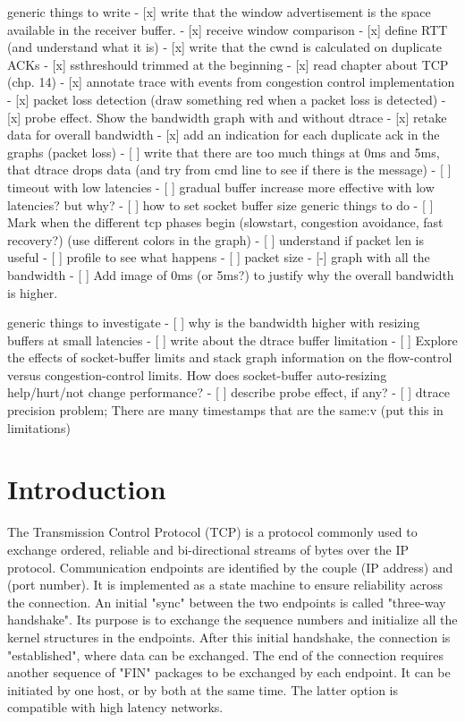 \documentclass[a4paper,10pt]{article}
\begin{document}
generic things to write
- [x] write that the window advertisement is the space available in the receiver buffer.
- [x] receive window comparison
- [x] define RTT (and understand what it is)
- [x] write that the cwnd is calculated on duplicate ACKs
- [x] ssthreshould trimmed at the beginning
- [x] read chapter about TCP (chp. 14)
- [x] annotate trace with events from congestion control implementation
- [x] packet loss detection (draw something red when a packet loss is detected)
- [x] probe effect. Show the bandwidth graph with and without dtrace
- [x] retake data for overall bandwidth
- [x] add an indication for each duplicate ack in the graphs (packet loss)
- [ ] write that there are too much things at 0ms and 5ms, that dtrace drops data (and try from cmd line to see if there is the message)
- [ ] timeout with low latencies
- [ ] gradual buffer increase more effective with low latencies? but why?
- [ ] how to set socket buffer size
generic things to do 
- [ ] Mark when  the different tcp phases begin (slowstart, congestion avoidance, fast recovery?) (use different colors in the graph)
- [ ] understand if packet len is useful
- [ ] profile to see what happens
- [ ] packet size
- [-] graph with all the bandwidth
- [ ] Add image of 0ms (or 5ms?) to justify why the overall bandwidth is higher.

generic things to investigate
- [ ] why is the bandwidth higher with resizing buffers at small latencies
- [ ] write about the dtrace buffer limitation
- [ ] Explore the effects of socket-buffer limits and stack graph information on the flow-control versus congestion-control limits. How does socket-buffer auto-resizing help/hurt/not change performance? 
- [ ] describe probe effect, if any?
- [ ] dtrace precision problem; There are many timestamps that are the same:v (put this in limitations)
\fi

\clearpage

\setcounter{page}{1}

\section{Introduction}
The Transmission Control Protocol (TCP) is a protocol commonly used to exchange ordered, reliable and bi-directional streams of bytes over the IP protocol. Communication endpoints are identified by the couple (IP address) and (port number). 
It is implemented as a state machine to ensure reliability across the connection. An initial "sync" between the two endpoints is called "three-way handshake". Its purpose is to exchange the sequence numbers and initialize all the kernel structures in the endpoints.
After this initial handshake, the connection is "established", where data can be exchanged.
The end of the connection requires another sequence of "FIN" packages to be exchanged by each endpoint. It can be initiated by one host, or by both at the same time. The latter option is compatible with high latency networks.
\end{document}
